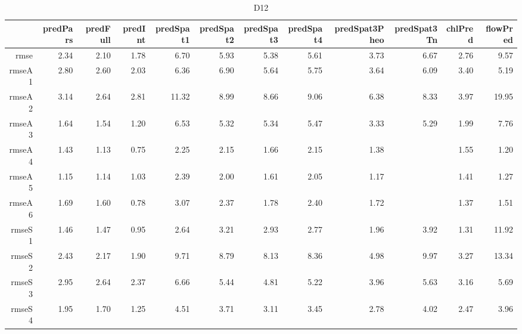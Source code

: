 \begin{table}[H]
\centering
\begingroup\fontsize{2.5pt}{4pt}\selectfont
\begin{tabular}{rrrrrrrrrrrr}
  \hline
 & predPars & predFull & predInt & predSpat1 & predSpat2 & predSpat3 & predSpat4 & predSpat3Pheo & predSpat3Tn & chlPred & flowPred \\ 
  \hline
rmse & 2.34 & 2.10 & 1.78 & 6.70 & 5.93 & 5.38 & 5.61 & 3.73 & 6.67 & 2.76 & 9.57 \\ 
  rmseA1 & 2.80 & 2.60 & 2.03 & 6.36 & 6.90 & 5.64 & 5.75 & 3.64 & 6.09 & 3.40 & 5.19 \\ 
  rmseA2 & 3.14 & 2.64 & 2.81 & 11.32 & 8.99 & 8.66 & 9.06 & 6.38 & 8.33 & 3.97 & 19.95 \\ 
  rmseA3 & 1.64 & 1.54 & 1.20 & 6.53 & 5.32 & 5.34 & 5.47 & 3.33 & 5.29 & 1.99 & 7.76 \\ 
  rmseA4 & 1.43 & 1.13 & 0.75 & 2.25 & 2.15 & 1.66 & 2.15 & 1.38 &  & 1.55 & 1.20 \\ 
  rmseA5 & 1.15 & 1.14 & 1.03 & 2.39 & 2.00 & 1.61 & 2.05 & 1.17 &  & 1.41 & 1.27 \\ 
  rmseA6 & 1.69 & 1.60 & 0.78 & 3.07 & 2.37 & 1.78 & 2.40 & 1.72 &  & 1.37 & 1.51 \\ 
  rmseS1 & 1.46 & 1.47 & 0.95 & 2.64 & 3.21 & 2.93 & 2.77 & 1.96 & 3.92 & 1.31 & 11.92 \\ 
  rmseS2 & 2.43 & 2.17 & 1.90 & 9.71 & 8.79 & 8.13 & 8.36 & 4.98 & 9.97 & 3.27 & 13.34 \\ 
  rmseS3 & 2.95 & 2.64 & 2.37 & 6.66 & 5.44 & 4.81 & 5.22 & 3.96 & 5.63 & 3.16 & 5.69 \\ 
  rmseS4 & 1.95 & 1.70 & 1.25 & 4.51 & 3.71 & 3.11 & 3.45 & 2.78 & 4.02 & 2.47 & 3.96 \\ 
   \hline
\end{tabular}
\endgroup
\caption{D12} 
\end{table}
